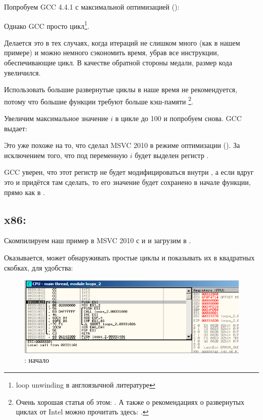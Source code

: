 \ifdefined\IncludeGCC
Попробуем GCC 4.4.1 с максимальной оптимизацией (\Othree):



Однако GCC просто  цикл\footnote{\gls{loop unwinding} в англоязычной литературе}.

Делается это в тех случаях, когда итераций не слишком много (как в нашем примере)
и можно немного сэкономить время, убрав все инструкции, обеспечивающие цикл. 
В качестве обратной стороны медали, размер кода увеличился.

Использовать большие развернутые циклы в наше время не рекомендуется, потому что большие
функции требуют больше кэш-памяти%
\footnote{Очень хорошая статья об этом: \cite{DrepperMemory}.
А также о рекомендациях о развернутых циклах от Intel можно прочитать здесь: 
\cite[3.4.1.7]{IntelOptimization}.}.

Увеличим максимальное значение $i$ в цикле до 100 и попробуем снова. GCC выдает:



Это уже похоже на то, что сделал MSVC 2010 в режиме оптимизации (\TT{\Ox}).
За исключением того, что под переменную $i$ будет выделен регистр \EBX.

GCC уверен, что этот регистр не будет 
модифицироваться внутри \ttf, а если вдруг это и придётся там сделать, то его значение будет сохранено 
в начале функции, прямо как в \main.

\fi

\ifdefined\IncludeOlly
\clearpage
\subsection{x86: \olly}
\index{\olly}

Скомпилируем наш пример в MSVC 2010 с \Ox и \Obzero и загрузим в \olly.

Оказывается, \olly может обнаруживать простые циклы и показывать их в квадратных скобках, 
для удобства:

\begin{figure}[H]
\centering
\includegraphics[scale=\FigScale]{patterns/09_loops/simple/olly1.png}
\caption{\olly: начало \main}
\label{fig:loops_olly_1}
\end{figure}

